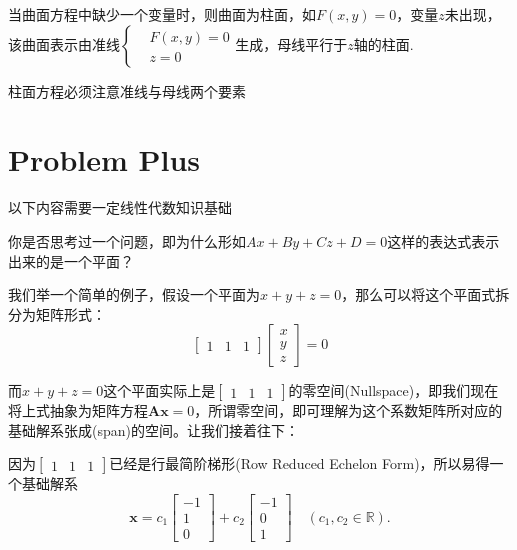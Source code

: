 当曲面方程中缺少一个变量时，则曲面为柱面，如$F(x,y)=0$，变量$z$未出现，该曲面表示由准线$\left\{\begin{aligned}& F(x,y)=0 \\ & z=0 \end{aligned}\right.$生成，母线平行于$z$轴的柱面.

柱面方程必须注意准线与母线两个要素

\newpage
{}
\section*{Problem Plus}
\begin{note}
    以下内容需要一定线性代数知识基础
\end{note}

你是否思考过一个问题，即为什么形如$Ax+By+Cz+D=0$这样的表达式表示出来的是一个平面？

我们举一个简单的例子，假设一个平面为$x+y+z=0$，那么可以将这个平面式拆分为矩阵形式：
\begin{equation}
    \begin{bmatrix}
        1 & 1 & 1
    \end{bmatrix}
    \begin{bmatrix}
        x \\ y \\ z
    \end{bmatrix}
    =0
    \nonumber
\end{equation}

而$x+y+z=0$这个平面实际上是$\begin{bmatrix} 1 & 1 & 1 \end{bmatrix}$的零空间(Nullspace)，即我们现在将上式抽象为矩阵方程$\mathbf{A}\mathbf{x}=0$，所谓零空间，即可理解为这个系数矩阵所对应的基础解系张成(span)的空间。让我们接着往下：

因为$\begin{bmatrix} 1 & 1 & 1 \end{bmatrix}$已经是行最简阶梯形(Row Reduced Echelon Form)，所以易得一个基础解系
\begin{equation*}
    \mathbf{x}=c_1\begin{bmatrix} -1 \\ 1 \\ 0 \end{bmatrix} + c_2\begin{bmatrix} -1 \\ 0 \\ 1 \end{bmatrix} \quad (c_1, c_2 \in \mathbb{R}).
\end{equation*}

